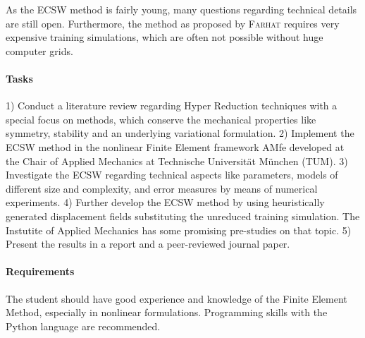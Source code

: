 \documentclass[10pt,a4paper]{AMdocument}
\begin{document}
As the ECSW method is fairly young, many questions regarding technical details are still open. Furthermore, the method as proposed by \textsc{Farhat} \cite{farhat2015structure} requires very expensive training simulations, which are often not possible without huge computer grids.


\paragraph{Tasks}
1) Conduct a literature review regarding Hyper Reduction techniques with a special focus on methods, which conserve the mechanical properties like symmetry, stability and an underlying variational formulation. 
2) Implement the ECSW method in the nonlinear Finite Element framework AMfe developed at the Chair of Applied Mechanics at Technische Universität München (TUM). 
3) Investigate the ECSW regarding technical aspects like parameters, models of different size and complexity, and error measures by means of numerical experiments. 
4) Further develop the ECSW method by using heuristically generated displacement fields substituting the unreduced training simulation. The Instutite of Applied Mechanics has some promising pre-studies on that topic. 
5) Present the results in a report and a peer-reviewed journal paper.

\paragraph{Requirements}
The student should have good experience and knowledge of the Finite Element Method, especially in nonlinear formulations. Programming skills with the Python language are recommended.

\printbibliography
\end{document}
